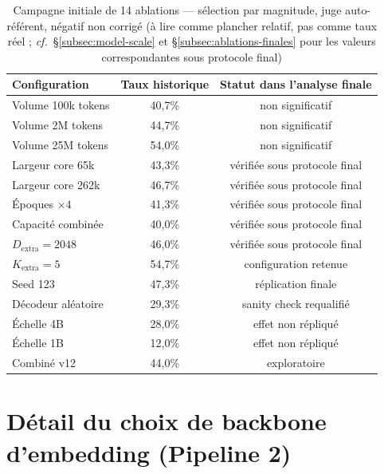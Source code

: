 \documentclass[11pt]{article}
\begin{document}
\begin{table}[!ht]
\centering
\caption{Campagne initiale de 14 ablations --- sélection par magnitude, juge
auto-référent, négatif non corrigé (à lire comme plancher relatif, pas comme
taux réel ; \emph{cf.}~\S\ref{subsec:model-scale} et \S\ref{subsec:ablations-finales}
pour les valeurs correspondantes sous protocole final)}
\label{tab:synthese}
\small
\begin{tabular}{@{}lcc@{}}
\toprule
Configuration & Taux historique & Statut dans l'analyse finale \\
\midrule
Volume 100k tokens & 40,7\% & non significatif \\
Volume 2M tokens & 44,7\% & non significatif \\
Volume 25M tokens & 54,0\% & non significatif \\
Largeur core 65k & 43,3\% & vérifiée sous protocole final \\
Largeur core 262k & 46,7\% & vérifiée sous protocole final \\
Époques $\times4$ & 41,3\% & vérifiée sous protocole final \\
Capacité combinée & 40,0\% & vérifiée sous protocole final \\
$D_\text{extra}=2048$ & 46,0\% & vérifiée sous protocole final \\
$K_\text{extra}=5$ & 54,7\% & configuration retenue \\
Seed 123 & 47,3\% & réplication finale \\
Décodeur aléatoire & 29,3\% & sanity check requalifié \\
Échelle 4B & 28,0\% & effet non répliqué \\
Échelle 1B & 12,0\% & effet non répliqué \\
Combiné v12 & 44,0\% & exploratoire \\
\bottomrule
\end{tabular}
\end{table}

\section{Détail du choix de backbone d'embedding (Pipeline 2)}
\label{app:pipeline2}
\end{document}

